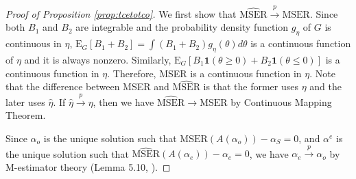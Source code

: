 \documentclass[11pt]{article}
\begin{document}
\begin{proof}[Proof of Proposition  \ref{prop:tcetotco}]
	We first show that $\widehat{\text{MSER}} \stackrel{p} \rightarrow \text{MSER}$. Since both $B_1$ and $B_2$ are integrable and the probability density function $g_{\eta}$ of $G$ is continuous in $\eta$, $\text{E}_G[B_1+B_2] = \int (B_1+B_2) g_{\eta}(\theta) d \theta$ is a continuous function of $\eta$ and it is always nonzero. Similarly, $\text{E}_G[B_1\textbf{1}(\theta \geq 0)+B_2\textbf{1}(\theta \leq 0)]$ is a continuous function in $\eta$. Therefore, MSER is a continuous function in $\eta$. Note that the difference between MSER and $\widehat{\text{MSER}}$ is that the former uses $\eta$ and the later uses $\hat \eta$. If $\hat \eta  \stackrel{p}\rightarrow \eta$, then we have $\widehat{\text{MSER}} \to \text{MSER}$ by Continuous Mapping Theorem. 
	
	Since $\alpha_o$ is the unique solution such that $\text{MSER}(A(\alpha_o)) - \alpha_S=0$, and $\alpha^e$ is the unique solution such that $\widehat{\text{MSER}}(A(\alpha_e)) - \alpha_e = 0$, we have $\alpha_e  \stackrel{p}\rightarrow \alpha_o$ by M-estimator theory (Lemma 5.10, \citet{van1998asymptotic}).
	
	
\end{proof}
\end{document}

